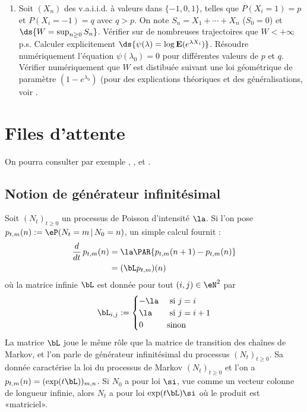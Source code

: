 {{\begin{enumerate}
  convergence dans $\mathbf{L}^1$ ?
\item Soit $(X_n)$ des v.a.i.i.d. à valeurs dans $\{-1,0,1\}$, telles que
  $P(X_i=1)=p$ et $P(X_i=-1)=q$ avec $q>p$. On note $S_n=X_1+\cdots+X_n$
  ($S_0=0$) et $\ds{W=\sup_{n \geq 0}S_n}$. Vérifier sur de
  nombreuses trajectoires que $W<+\infty$ p.s. Calculer explicitement
  $\ds{\psi(\lambda)=\log \mathbf{E}(e^{\lambda X_i})}$. Résoudre
  numériquement l'équation $\psi(\lambda_0)=0$ pour différentes valeurs de $p$
  et $q$. Vérifier numériquement que $W$ est distibuée suivant une loi
  géométrique de paramètre $(1-e^{\lambda_0})$ (pour des explications
  théoriques et des généralisations, voir \cite{baldi-mazliak-priouret}.
\end{enumerate}    

%
%
\chapter{Files d'attente}
%
%

On pourra consulter par exemple \cite{bon}, \cite{bouleau2},
\cite{dacunha-castelle-duflo-2} et \cite{ross-1}.


%
\section{Notion de générateur infinitésimal}
%

Soit $(N_t)_{t\geq 0}$ un processus de Poisson d'intensité $\la$. Si l'on pose
$p_{t,m}(n):=\eP(N_t=m\,\vert\,N_0=n)$, un simple calcul fournit :
\begin{align*}
\frac{d}{dt}\,p_{t,m}(n)
&=\la \PAR{p_{t,m}(n+1)-p_{t,m}(n)}\\
&=(\bL p_{t,m})(n)
\end{align*}
où la matrice infinie $\bL$ est donnée pour tout $(i,j)\in\eN^2$ par
$$
\bL_{i,j}:=
\begin{cases}
  -\la & \text{ si $j=i$} \\
  \la & \text{ si $j=i+1$} \\
  0 & \text{sinon}
\end{cases}
$$
La matrice $\bL$ joue le même rôle que la matrice de transition des chaînes
de Markov, et l'on parle de générateur infinitésimal du processus
$(N_t)_{t\geq 0}$. Sa donnée caractérise la loi du processus de Markov
$(N_t)_{t\geq 0}$ et l'on a $p_{t,m}(n)=(\exp(t\bL))_{m,n}$. Si $N_0$ a pour
loi $\si$, vue comme un vecteur colonne de longueur infinie, alors $N_t$ a
pour loi $\exp(t\bL)\si$ où le produit est «matriciel».

}}
